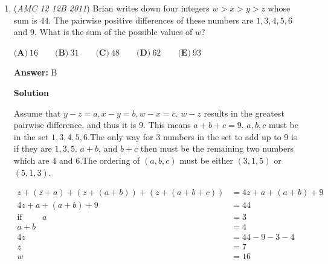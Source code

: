 \begin{enumerate}
\textbf{Solution}

Instead of doing mindless algebra, let's set the side lengths of the square to $1$.

 After careful inspection of the regular octagon, we find that all of the sides of the regular octagon must be $1$.

 This gives the total area to be $4 \cdot \text{triangle area}$ + $4 \cdot \text{rectangle area}$ + $\text{square area}$ = $4(\dfrac{1}{4}) + 4(\sqrt{\dfrac{1}{2}}) + 1$, which simplifies to $2(1+\sqrt{2})$.

 The percent area of the center square is the area of the square divided by the total area of the regular octagon. This gives $\dfrac{1}{2(1+\sqrt{2})}.$ Multiplying by the conjugate gives answer choice $\boxed{(A).}$



	\item (\textit{AMC 12 12B 2011}) Brian writes down four integers $w > x > y > z$ whose sum is $44$. The pairwise positive differences of these numbers are $1, 3, 4, 5, 6$ and $9$. What is the sum of the possible values of $w$?


 $\textbf{(A)}\ 16 \qquad \textbf{(B)}\ 31 \qquad \textbf{(C)}\ 48 \qquad \textbf{(D)}\ 62 \qquad \textbf{(E)}\ 93$

 \textbf{Answer: }B



\textbf{Solution}

Assume that $y-z=a, x-y=b, w-x=c.$ $w-z$ results in the greatest pairwise difference, and thus it is $9$. This means $a+b+c=9$. $a,b,c$ must be in the set ${1,3,4,5,6}$.The only way for 3 numbers in the set to add up to 9 is if they are $1,3,5$. $a+b$, and $b+c$ then must be the remaining two numbers which are $4$ and $6$.The ordering of $(a,b,c)$ must be either $(3,1,5)$ or $(5,1,3)$.

 

 \begin{align*} z + (z + a) + (z + (a + b)) + (z + (a + b + c)) &= 4z + a + (a + b) + 9\\ 4z + a + (a + b) + 9 &= 44\\ \text{if} \hspace{1cm} a &= 3 \\ a + b &= 4\\ 4z &= 44 - 9 - 3 - 4\\ z &= 7\\ w &= 16\\ \end{align*}



\end{enumerate}
